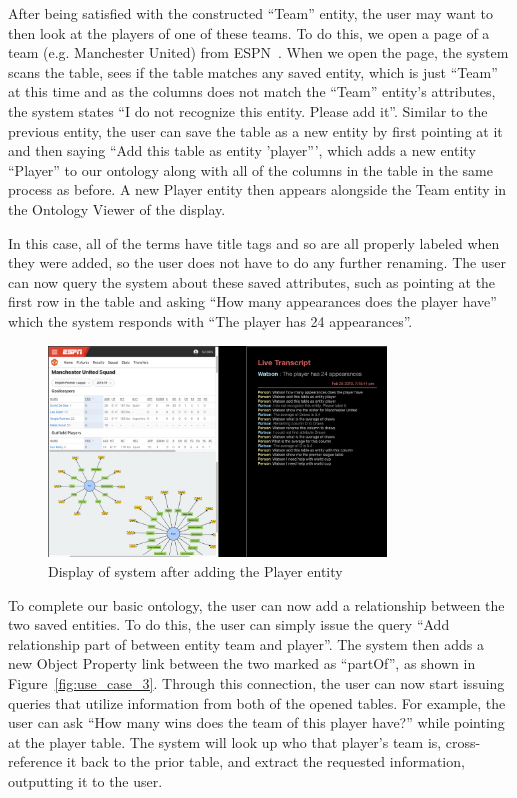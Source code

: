After being satisfied with the constructed ``Team'' entity, the user may want
to then look at the players of one of these teams. To
do this, we open a page of a team (e.g. Manchester United) from ESPN~\cite{espn_squad_table}. When we open
the page, the system scans the table, sees if the table matches
any saved entity, which is just ``Team'' at this time and as the columns does not match the ``Team'' entity's attributes,
the system states ``I do not recognize this entity. Please add it''. Similar
to the previous entity, the user
can save the table as a new entity by first pointing at it and then saying ``Add this table as entity 'player''', which
adds a new entity ``Player'' to our ontology along with all of the columns in the
table in the same process as before. A new Player entity then appears alongside the Team entity in the Ontology Viewer of the display.

In this case, all of the terms have title tags and so are all properly labeled when they were added, so the user does not have to do any further renaming. The user can
now query the system about these saved attributes, such as pointing at the first
row in the table and asking ``How many appearances does the player have'' which
the system responds with ``The player has 24 appearances''.

\begin{figure}[hbtp]
\centering
\includegraphics[width=0.8\textwidth]{chapters/03_reagent/figures/use_case_2.png}
\caption{Display of system after adding the Player entity}
\label{fig:use_case_2}
\end{figure}

To complete our basic ontology, the user can now add a relationship
between the two saved entities. To do this, the user can simply issue
the query ``Add relationship part of between entity team and player''. The
system then adds a new Object Property link between the two marked as 
``partOf'', as shown in Figure~\ref{fig:use_case_3}. Through this connection,
the user can now start issuing queries that utilize information from both of the opened tables. For example,
the user can ask ``How many wins does the team of this player have?'' while pointing
at the player table. The system will look up who that player's team is, cross-reference it
back to the prior table, and extract the requested information, outputting it to the user.

